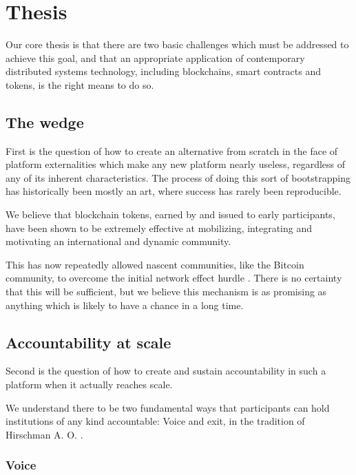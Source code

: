 \documentclass{article}
\begin{document}
\section{Thesis}

Our core thesis is that there are two basic challenges which must be addressed to achieve this goal, and that an appropriate application of contemporary distributed systems technology, including blockchains, smart contracts and tokens, is the right means to do so.

\subsection{The wedge}

First is the question of how to create an alternative from scratch in the face of platform externalities which make any new platform nearly useless, regardless of any of its inherent characteristics. The process of doing this sort of bootstrapping has historically been mostly an art, where success has rarely been reproducible.

We believe that blockchain tokens, earned by and issued to early participants, have been shown to be extremely effective at mobilizing, integrating and motivating an international and dynamic community.

This has now repeatedly allowed nascent communities, like the Bitcoin community, to overcome the initial network effect hurdle \cite{decentralized_business_model, thoughts_on_tokens, crypto_tokens}. There is no certainty that this will be sufficient, but we believe this mechanism is as promising as anything which is likely to have a chance in a long time.

\subsection{Accountability at scale}

Second is the question of how to create and sustain accountability in such a platform when it actually reaches scale.

We understand there to be two fundamental ways that participants can hold institutions of any kind accountable: Voice and exit, in the tradition of Hirschman A. O. \cite{hirschman1970exit}.
    
\subsubsection{Voice}
\end{document}
